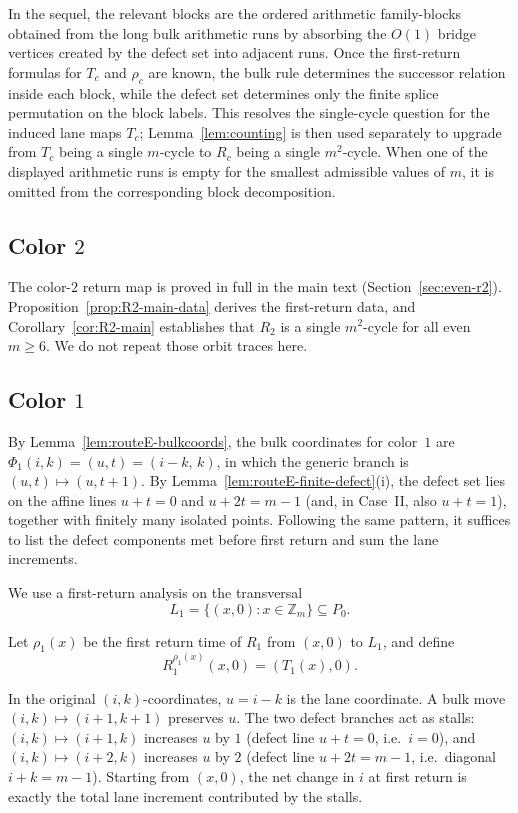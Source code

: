 \documentclass[11pt]{article}
\newcommand{\Zm}{\mathbb Z_m}
\begin{document}
In the sequel, the relevant blocks are the ordered arithmetic family-blocks obtained from the long bulk arithmetic runs by absorbing the $O(1)$ bridge vertices created by the defect set into adjacent runs.
Once the first-return formulas for $T_c$ and $\rho_c$ are known, the bulk rule determines the successor relation inside each block, while the defect set determines only the finite splice permutation on the block labels.
This resolves the single-cycle question for the induced lane maps $T_c$; Lemma~\ref{lem:counting} is then used separately to upgrade from $T_c$ being a single $m$-cycle to $R_c$ being a single $m^2$-cycle.
When one of the displayed arithmetic runs is empty for the smallest admissible values of $m$, it is omitted from the corresponding block decomposition.

\subsection{Color $2$}

The color-$2$ return map is proved in full in the main text (Section~\ref{sec:even-r2}).
Proposition~\ref{prop:R2-main-data} derives the first-return data, and Corollary~\ref{cor:R2-main} establishes that $R_2$ is a single $m^2$-cycle for all even $m\ge 6$.
We do not repeat those orbit traces here.


\subsection{Color $1$}

By Lemma~\ref{lem:routeE-bulkcoords}, the bulk coordinates for color~$1$ are $\Phi_1(i,k)=(u,t)=(i-k,\,k)$, in which the generic branch is $(u,t)\mapsto(u,t+1)$.
By Lemma~\ref{lem:routeE-finite-defect}\textup{(i)}, the defect set lies on the affine lines $u+t=0$ and $u+2t=m-1$ (and, in Case~II, also $u+t=1$), together with finitely many isolated points.
Following the same pattern, it suffices to list the defect components met before first return and sum the lane increments.

We use a first-return analysis on the transversal
\[
L_1=\{(x,0):x\in \Zm\}\subseteq P_0.
\]

Let $\rho_1(x)$ be the first return time of $R_1$ from $(x,0)$ to $L_1$, and define
\[
R_1^{\rho_1(x)}(x,0)=(T_1(x),0).
\]

In the original $(i,k)$-coordinates, $u=i-k$ is the lane coordinate.
A bulk move $(i,k)\mapsto(i+1,k+1)$ preserves $u$.
The two defect branches act as stalls: $(i,k)\mapsto(i+1,k)$ increases $u$ by $1$ (defect line $u+t=0$, i.e.\ $i=0$), and $(i,k)\mapsto(i+2,k)$ increases $u$ by $2$ (defect line $u+2t=m-1$, i.e.\ diagonal $i+k=m-1$).
Starting from $(x,0)$, the net change in $i$ at first return is exactly the total lane increment contributed by the stalls.
\end{document}
